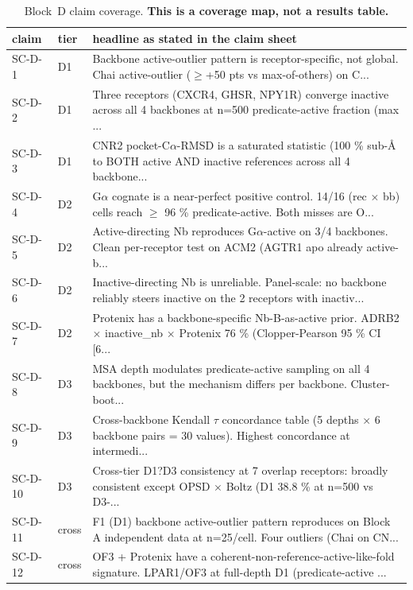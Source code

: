\begin{table}[htbp]
\centering
\footnotesize
\caption{Block~D claim coverage. \textbf{This is a coverage map, not a results table.}}
\label{stab:blockd_coverage}
\begin{tabular}{llp{10.6cm}}
\toprule
claim & tier & headline as stated in the claim sheet \\
\midrule
SC-D-1 & D1 & Backbone active-outlier pattern is receptor-specific, not global. Chai active-outlier ($\geq$+50 pts vs max-of-others) on C... \\
SC-D-2 & D1 & Three receptors (CXCR4, GHSR, NPY1R) converge inactive across all 4 backbones at n=500 predicate-active fraction (max ... \\
SC-D-3 & D1 & CNR2 pocket-C$\alpha$-RMSD is a saturated statistic (100 \% sub-\AA{} to BOTH active AND inactive references across all 4 backbone... \\
SC-D-4 & D2 & G$\alpha$ cognate is a near-perfect positive control. 14/16 (rec $\times$ bb) cells reach $\geq$ 96 \% predicate-active. Both misses are O... \\
SC-D-5 & D2 & Active-directing Nb reproduces G$\alpha$-active on 3/4 backbones. Clean per-receptor test on ACM2 (AGTR1 apo already active-b... \\
SC-D-6 & D2 & Inactive-directing Nb is unreliable. Panel-scale: no backbone reliably steers inactive on the 2 receptors with inactiv... \\
SC-D-7 & D2 & Protenix has a backbone-specific Nb-B-as-active prior. ADRB2 $\times$ inactive\_nb $\times$ Protenix 76 \% (Clopper-Pearson 95 \% CI [6... \\
SC-D-8 & D3 & MSA depth modulates predicate-active sampling on all 4 backbones, but the mechanism differs per backbone. Cluster-boot... \\
SC-D-9 & D3 & Cross-backbone Kendall $\tau$ concordance table (5 depths $\times$ 6 backbone pairs = 30 values). Highest concordance at intermedi... \\
SC-D-10 & D3 & Cross-tier D1?D3 consistency at 7 overlap receptors: broadly consistent except OPSD $\times$ Boltz (D1 38.8 \% at n=500 vs D3-... \\
SC-D-11 & cross & F1 (D1) backbone active-outlier pattern reproduces on Block A independent data at n=25/cell. Four outliers (Chai on CN... \\
SC-D-12 & cross & OF3 + Protenix have a coherent-non-reference-active-like-fold signature. LPAR1/OF3 at full-depth D1 (predicate-active ... \\

\end{tabular}
\end{table}
